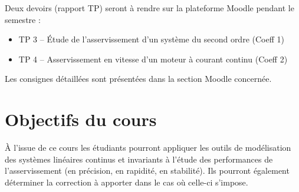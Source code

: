 \documentclass[a4paper,11pt]{article}
\begin{document}
Deux devoirs (rapport TP) seront à rendre sur la plateforme Moodle pendant le semestre :
\begin{itemize}
    \item TP 3 -- \'Etude de l'asservissement d'un système du second ordre (Coeff 1)
    \item TP 4 -- Asservissement en vitesse d'un moteur à courant continu  (Coeff 2)
\end{itemize}

Les consignes détaillées sont présentées dans la section Moodle concernée. 

\clearpage
\section*{Objectifs du cours}
À l'issue de ce cours les étudiants pourront appliquer les outils de modélisation 
des systèmes linéaires continus et invariants à 
l'étude des performances de l'asservissement (en précision, en rapidité, en stabilité).
Ils pourront également déterminer la correction à apporter dans le cas où celle-ci s'impose.

\end{document}

